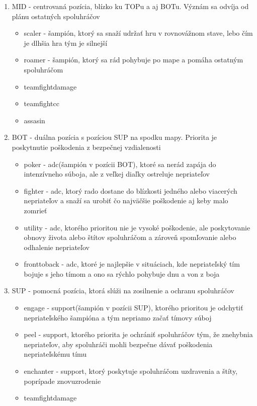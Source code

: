 \begin{enumerate}
\begin{itemize}
	\end{itemize}
	\item MID - centrovaná pozícia, blízko ku TOPu a aj BOTu. Význám sa odvíja od plánu ostatných spoluhráčov
	\begin{itemize}
		\item scaler - šampión, ktorý sa snaží udržať hru v rovnovážnom stave, lebo čím je dlhšia hra tým je silnejší
		\item roamer - šampión, ktorý sa rád pohybuje po mape a pomáha ostatným spoluhráčom
		\item teamfightdamage 
		\item teamfightcc 
		\item assasin
	\end{itemize}
	\item BOT - duálna pozícia s pozíciou SUP na spodku mapy. Priorita je poskytnutie poškodenia z bezpečnej vzdialenosti
	\begin{itemize}
		\item poker - adc(šampión v pozícii BOT), ktoré sa nerád zapája do intenzívneho súboja, ale z veľkej diaľky ostreluje nepriateľov
		\item fighter - adc, ktorý rado dostane do blízkosti jedného alebo viacerých nepriateľov a snaží sa urobiť čo najväčšie poškodenie aj keby malo zomrieť 
		\item utility - adc, ktorého prioritou nie je vysoké poškodenie, ale poskytovanie obnovy života alebo štítov spoluhráčom a zároveň spomľovanie alebo odhalenie nepriateľov
		\item fronttoback - adc, ktoré je najlepšie v situáciach, kde nepriateľský tím bojuje s jeho tímom a ono sa rýchlo pohybuje dnu a von z boja
	\end{itemize}
\item SUP - pomocná pozícia, ktorá slúži na zosilnenie a ochranu spoluhráčov
\begin{itemize}
	\item engage - support(šampión v pozícii SUP), ktorého prioritou je odchytiť nepriateľského šampióna a tým nepriamo začať tímovy súboj
	\item peel - support, ktorého priorita je ochrániť spoluhráčov tým, že znehybnia nepriateľov, aby spoluhráči mohli bezpečne dávať poškodenia nepriateľskému tímu
	\item enchanter - support, ktorý poskytuje spoluhráčom uzdravenia a štíty, poprípade znovuzrodenie
	\item teamfightdamage
\end{itemize}
\end{enumerate}
